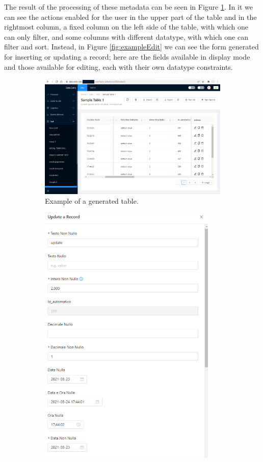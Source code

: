 The result of the processing of these metadata can be seen in Figure \ref{fig:example}. In it we can see the actions enabled for the user in the upper part of the table and in the rightmost column, a fixed column on the left side of the table, with which one can only filter, and some columns with different datatype, with which one can filter and sort. Instead, in Figure \ref{fig:exampleEdit} we can see the form generated for inserting or updating a record; here are the fields available in display mode and those available for editing, each with their own datatype constraints.


\begin{figure}[!htb]
    \centering
    \begin{subfigure}{\linewidth}
        \centering
        \includegraphics[width=14.5cm]{chapters/images/ch_3/FE/User/example.png}
        \caption{Example of a generated table.}
        \label{fig:example}
    \end{subfigure}
    \begin{subfigure}{\linewidth}
        \centering
        \includegraphics[width=8.5cm]{chapters/images/ch_3/FE/User/editExample.png}

\end{subfigure}
\end{figure}
